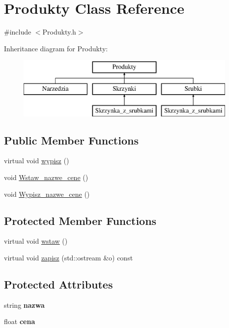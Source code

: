 \hypertarget{class_produkty}{}\section{Produkty Class Reference}
\label{class_produkty}


{\ttfamily \#include $<$Produkty.\+h$>$}

Inheritance diagram for Produkty\+:\begin{figure}[H]
\begin{center}
\leavevmode
\includegraphics[height=3.000000cm]{class_produkty}
\end{center}
\end{figure}
\subsection*{Public Member Functions}
\begin{DoxyCompactItemize}
\item 
virtual void \mbox{\hyperlink{class_produkty_a720c6591cfbb332f99baccf0f54c4ada}{wypisz}} ()
\item 
void \mbox{\hyperlink{class_produkty_a73fe67e794f741b972330c09a8cf8e55}{Wstaw\+\_\+nazwe\+\_\+cene}} ()
\item 
void \mbox{\hyperlink{class_produkty_ac38af686bb465b62fd499dec9dd6c246}{Wypisz\+\_\+nazwe\+\_\+cene}} ()
\end{DoxyCompactItemize}
\subsection*{Protected Member Functions}
\begin{DoxyCompactItemize}
\item 
virtual void \mbox{\hyperlink{class_produkty_ad69fa64c8984c55fe9b1a2ade607a0ed}{wstaw}} ()
\item 
virtual void \mbox{\hyperlink{class_produkty_a49c2ba4084346df8e7c987b9ec62676e}{zapisz}} (std\+::ostream \&o) const
\end{DoxyCompactItemize}
\subsection*{Protected Attributes}
\begin{DoxyCompactItemize}
\item 
\mbox{\label{class_produkty_aafbfed7251061470ba934e02ef902428}} 
string {\bfseries nazwa}
\item 
\mbox{\label{class_produkty_a28eb276dae9d80062d5384be339d87d9}} 
float {\bfseries cena}
\end{DoxyCompactItemize}
